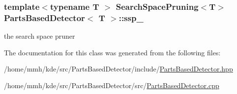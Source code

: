 \hypertarget{classPartsBasedDetector_aae91c693f9d01e3e6cbd552d7f81e474}{
\subsubsection[{ssp\-\_\-}]{\setlength{\rightskip}{0pt plus 5cm}template$<$typename T $>$ {\bf Search\-Space\-Pruning}$<$T$>$ {\bf Parts\-Based\-Detector}$<$ T $>$\-::ssp\-\_\-\hspace{0.3cm}{\ttfamily [private]}}}\label{classPartsBasedDetector_aae91c693f9d01e3e6cbd552d7f81e474}


the search space pruner 



The documentation for this class was generated from the following files\-:\begin{DoxyCompactItemize}
\item 
/home/mmh/kde/src/\-Parts\-Based\-Detector/include/\hyperlink{PartsBasedDetector_8hpp}{Parts\-Based\-Detector.\-hpp}\item 
/home/mmh/kde/src/\-Parts\-Based\-Detector/src/\hyperlink{PartsBasedDetector_8cpp}{Parts\-Based\-Detector.\-cpp}\end{DoxyCompactItemize}
